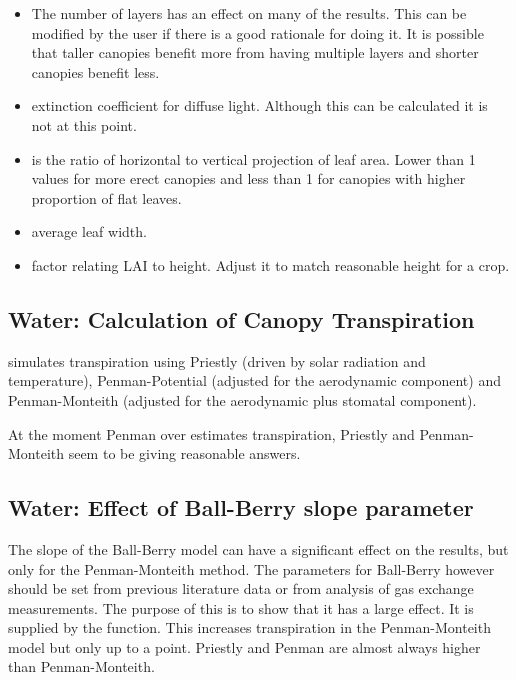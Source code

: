 \documentclass[12pt]{article}\usepackage[]{graphicx}\usepackage[]{color}
\begin{document}
\begin{itemize}
\item {} The number of layers has an effect on many of the
  results. This can be modified by the user if there is a good
  rationale for doing it. It is possible that taller canopies benefit
  more from having multiple layers and shorter canopies benefit less.
\item {} extinction coefficient for diffuse light. Although this can be
  calculated it is not at this point.
\item {} is the ratio of horizontal to vertical projection
  of leaf area. Lower than 1 values for more erect canopies and less
  than 1 for canopies with higher proportion of flat leaves.
\item {} average leaf width. 
\item {} factor relating LAI to height. Adjust it to
  match reasonable height for a crop.
\end{itemize}

\subsection{Water: Calculation of Canopy Transpiration}

 simulates transpiration using Priestly (driven by solar
radiation and temperature), Penman-Potential (adjusted for the aerodynamic
component) and Penman-Monteith (adjusted for the aerodynamic plus
stomatal component).



At the moment Penman over estimates transpiration, Priestly and
Penman-Monteith seem to be giving reasonable answers.

\subsection{Water: Effect of Ball-Berry slope parameter}

The slope of the Ball-Berry model can have a significant effect on the
results, but only for the Penman-Monteith method. The parameters for
Ball-Berry however should be set from previous literature data or from
analysis of gas exchange measurements. The purpose of this is to show
that it has a large effect. It is supplied by the 
function. This increases transpiration in the Penman-Monteith model
but only up to a point.  Priestly and Penman are almost always higher
than Penman-Monteith.
\end{document}
